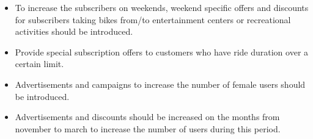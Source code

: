 \documentclass[
]{article}
\begin{document}
\begin{itemize}
\item
  To increase the subscribers on weekends, weekend specific offers and
  discounts for subscribers taking bikes from/to entertainment centers
  or recreational activities should be introduced.
\item
  Provide special subscription offers to customers who have ride
  duration over a certain limit.
\item
  Advertisements and campaigns to increase the number of female users
  should be introduced.
\item
  Advertisements and discounts should be increased on the months from
  november to march to increase the number of users during this period.
\end{itemize}
\end{document}
